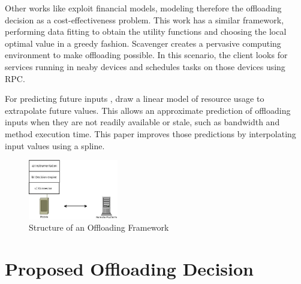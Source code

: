 \documentclass[10pt, conference, letterpaper]{IEEEtran}
\begin{document}
  Other works like \cite{6162380} exploit financial models, modeling therefore the offloading decision as a cost-effectiveness problem. 
  This work has a similar framework, performing data fitting to obtain the utility functions and choosing the local optimal value in a greedy fashion. Scavenger \cite{5466972} creates a pervasive computing environment to make offloading possible. In this scenario, the client looks for services running in neaby devices and schedules tasks on those devices using RPC.

  For predicting future inputs ,\cite{Balan:2003:TRE:1066116.1066125,Cuervo:2010:MMS:1814433.1814441,kosta2012thinkair} draw a linear model of resource usage to extrapolate future values. This allows an approximate prediction of offloading inputs when they are not readily available or stale, such as bandwidth and method execution time. This paper improves those predictions by interpolating input values using a spline.

\begin{figure}[!t]
  \centering
  \includegraphics[width=0.35\textwidth]{imgs/system.jpeg}
  \caption{Structure of an Offloading Framework}
  \label{fig:systemDiagram}
\end{figure}

\section{Proposed Offloading Decision} 
\label{sec:design}
\end{document}
